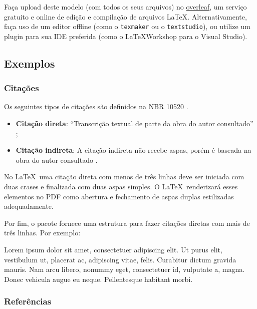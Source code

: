 \documentclass[
	article,			%
	12pt,				%
	oneside,			%
	a4paper,			%
	english,			%
	brazil,				%
	sumario=tradicional
]{abntex2}
\begin{document}
Faça upload deste modelo (com todos os seus arquivos) no \href{https://overleaf.com/project}{overleaf}, um  serviço gratuito e online de edição e compilação de arquivos \LaTeX. Alternativamente, faça uso de um editor offline (como o \texttt{texmaker} ou o \texttt{textstudio}), ou utilize um plugin para sua IDE preferida (como o \LaTeX Workshop para o Visual Studio).

\subsection{Exemplos}

\subsubsection{Citações}

Os seguintes tipos de citações são definidos na NBR 10520 \cite{NBR10520:2002}.

\begin{itemize}
	\item \textbf{Citação direta}: ``Transcrição textual de parte da obra do autor consultado'' \cite{NBR10520:2002};
	\item \textbf{Citação indireta}: A citação indireta não recebe aspas, porém é baseada na obra do autor consultado \cite{NBR10520:2002}.
\end{itemize}

No \LaTeX\ uma citação direta com menos de três linhas deve ser iniciada com duas crases e finalizada com duas aspas simples. O \LaTeX\ renderizará esses elementos no PDF como abertura e fechamento de aspas duplas estilizadas adequadamente.

Por fim, o pacote \abnTeX fornece uma estrutura para fazer citações diretas com mais de três linhas. Por exemplo:

\begin{citacao}
	Lorem ipsum dolor sit amet, consectetuer adipiscing elit. Ut purus elit, vestibulum ut, placerat ac, adipiscing vitae, felis. Curabitur dictum gravida mauris. Nam arcu libero, nonummy eget, consectetuer id, vulputate a, magna. Donec vehicula augue eu neque. Pellentesque habitant morbi.
 \end{citacao}

\subsubsection{Referências}
\end{document}
